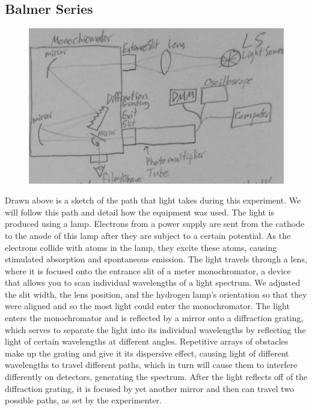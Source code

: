 \documentclass{article}
\begin{document}
    \subsection{Balmer Series}
    \begin{figure}[H]
    \centering
    \includegraphics[scale = 0.2]{ATM1a.jpg}
    \caption{}
    \label{fig:my_label}
\end{figure}
    Drawn above is a sketch of the path that light takes during this experiment. We will follow this path and detail how the equipment was used. The light is produced using a lamp. Electrons from a power supply are sent from the cathode to the anode of this lamp after they are subject to a certain potential. As the electrons collide with atoms in the lamp, they excite these atoms, causing stimulated absorption and spontaneous emission. The light travels through a lens, where it is focused onto the entrance slit of a meter monochromator, a device that allows you to scan individual wavelengths of a light spectrum. We adjusted the slit width, the lens position, and the hydrogen lamp's orientation so that they were aligned and so the most light could enter the monochromator. The light enters the monochromator and is reflected by a mirror onto a diffraction grating, which serves to separate the light into its individual wavelengths by reflecting the light of certain wavelengths at different angles. Repetitive arrays of obstacles make up the grating and give it its dispersive effect, causing light of different wavelengths to travel different paths, which in turn will cause them to interfere differently on detectors, generating the spectrum. After the light reflects off of the diffraction grating, it is focused by yet another mirror and then can travel two possible paths, as set by the experimenter. 
\end{document}
